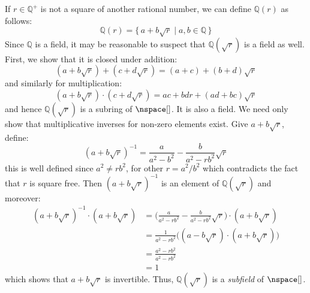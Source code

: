 \documentclass{article}                                                        %
\begin{document}
        \begin{example}
            If $r\in\mathbb{Q}^{+}$ is not a square of another rational number,
            we can define $\mathbb{Q}(r)$ as follows:
            \begin{equation}
                \mathbb{Q}(r)=\{\,a+b\sqrt{r}\;|\;a,b\in\mathbb{Q}\,\}
            \end{equation}
            Since $\mathbb{Q}$ is a field, it may be reasonable to suspect that
            $\mathbb{Q}(\sqrt{r})$ is a field as well. First, we show that it is
            closed under addition:
            \begin{equation}
                (a+b\sqrt{r})+(c+d\sqrt{r})=(a+c)+(b+d)\sqrt{r}
            \end{equation}
            and similarly for multiplication:
            \begin{equation}
                (a+b\sqrt{r})\cdot(c+d\sqrt{r})=ac+bdr+(ad+bc)\sqrt{r}
            \end{equation}
            and hence $\mathbb{Q}(\sqrt{r})$ is a subring of $\nspace[]$. It is
            also a field. We need only show that multiplicative inverses for
            non-zero elements exist. Give $a+b\sqrt{r}$, define:
            \begin{equation}
                (a+b\sqrt{r})^{\minus{1}}=\frac{a}{a^{2}-b^{2}}-
                    \frac{b}{a^{2}-rb^{2}}\sqrt{r}
            \end{equation}
            this is well defined since $a^{2}\ne{r}b^{2}$, for other
            $r=a^{2}/b^{2}$ which contradicts the fact that $r$ is square free.
            Then $(a+b\sqrt{r})^{\minus{1}}$ is an element of
            $\mathbb{Q}(\sqrt{r})$ and moreover:
            \begin{subequations}
                \begin{align}
                    (a+b\sqrt{r})^{\minus{1}}\cdot(a+b\sqrt{r})
                    &=\Big(\frac{a}{a^{2}-rb^{2}}-
                        \frac{b}{a^{2}-rb^{2}}\sqrt{r}\Big)\cdot(a+b\sqrt{r})\\
                    &=\frac{1}{a^{2}-rb^{2}}\big(
                        (a-b\sqrt{r})\cdot(a+b\sqrt{r})\big)\\
                    &=\frac{a^{2}-rb^{2}}{a^{2}-rb^{2}}\\
                    &=1
                \end{align}
            \end{subequations}
            which shows that $a+b\sqrt{r}$ is invertible. Thus,
            $\mathbb{Q}(\sqrt{r})$ is a \textit{subfield} of $\nspace[]$.
        \end{example}
\end{document}
